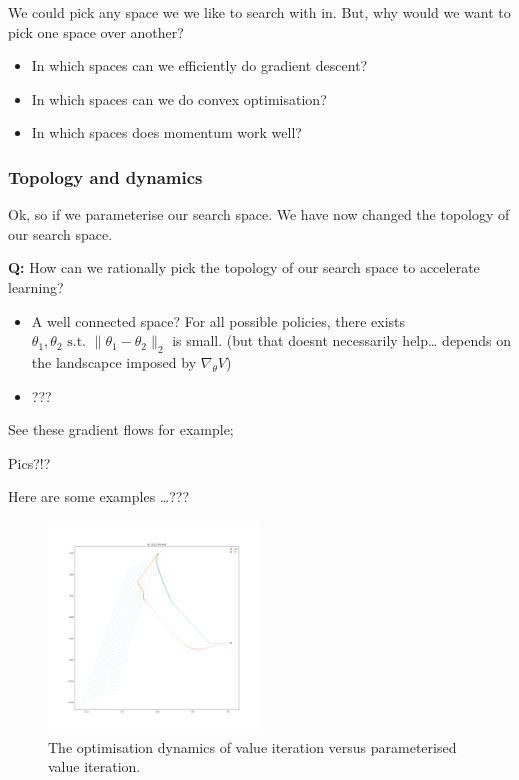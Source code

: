 We could pick any space we we like to search with in. But, why would we want to pick one space over another?

\begin{itemize}
\tightlist
\item
  In which spaces can we efficiently do gradient descent?
\item
  In which spaces can we do convex optimisation?
\item
  In which spaces does momentum work well?
\end{itemize}

\subsubsection{Topology and dynamics}

Ok, so if we parameterise our search space. We have now changed the
topology of our search space.

\textbf{Q:} How can we rationally pick the topology of our search space
to accelerate learning?

\begin{itemize}
\item
  A well connected space? For all possible policies, there exists
  \(\theta_1, \theta_2 \text{ s.t. } \parallel \theta_1- \theta_2\parallel_2\)
  is small. (but that doesnt necessarily help\ldots{} depends on the
  landscapce imposed by \(\nabla_{\theta} V\))
\item
  ???
\end{itemize}

See these gradient flows for example;

Pics?!?

Here are some examples \ldots{}???

\begin{figure}
\centering
\includegraphics[width=0.5\textwidth,height=0.5\textheight]{../../pictures/figures/vi-vs-pvi.png}
\caption{The optimisation dynamics of value iteration versus parameterised value iteration.}
\end{figure}

